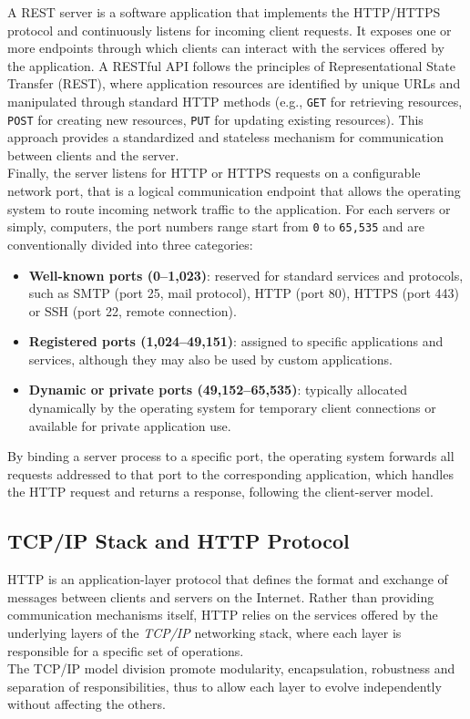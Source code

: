 A REST server is a software application that implements the HTTP/HTTPS protocol and continuously listens for incoming client requests. It exposes one or more endpoints through which clients can interact with the services offered by the application.
A RESTful API follows the principles of Representational State Transfer (REST), where application resources are identified by unique URLs and manipulated through standard HTTP methods (e.g., \texttt{GET} for retrieving resources, \texttt{POST} for creating new resources, \texttt{PUT} for updating existing resources). This approach provides a standardized and stateless mechanism for communication between clients and the server.\\
Finally, the server listens for HTTP or HTTPS requests on a configurable network port, that is a logical communication endpoint that allows the operating system to route incoming network traffic to the application. For each servers or simply, computers, the port numbers range start from \texttt{0} to \texttt{65,535} and are conventionally divided into three categories:
\begin{itemize}
    \item \textbf{Well-known ports (0--1,023)}: reserved for standard services and protocols, such as SMTP (port 25, mail protocol), HTTP (port 80), HTTPS (port 443) or SSH (port 22, remote connection).
    \item \textbf{Registered ports (1,024--49,151)}: assigned to specific applications and services, although they may also be used by custom applications.
    \item \textbf{Dynamic or private ports (49,152--65,535)}: typically allocated dynamically by the operating system for temporary client connections or available for private application use.
\end{itemize}


By binding a server process to a specific port, the operating system forwards all requests addressed to that port to the corresponding application, which handles the HTTP request and returns a response, following the client-server model.


\subsection{TCP/IP Stack and HTTP Protocol}
\label{sub:tcpipstack}

HTTP is an application-layer protocol that defines the format and exchange of messages between clients and servers on the Internet. Rather than providing communication mechanisms itself, HTTP relies on the services offered by the underlying layers of the \textit{TCP/IP} networking stack, where each layer is responsible for a specific set of operations. \\
The TCP/IP model division promote modularity, encapsulation, robustness and separation of responsibilities, thus to allow each layer to evolve independently without affecting the others.

